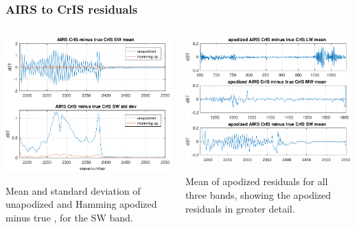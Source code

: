 \documentclass[10pt]{beamer}
\begin{document}
\begin{frame}
\frametitle{AIRS to CrIS residuals}
\begin{columns}[t]
\begin{column}{0.5\textwidth}
  \begin{centering}
  \includegraphics[width=\textwidth]{figures/a2cris_diff_SW.pdf}
  \end{centering}\vspace{3mm}
  Mean and standard deviation of unapodized and Hamming apodized
  {\airs} {\cris} minus true {\cris}, for the {\cris} SW band.

\end{column}
\begin{column}{0.5\textwidth}  
  \begin{centering}
  \includegraphics[width=\textwidth]{figures/a2cris_diff_all.pdf}
  \end{centering}\vspace{5mm}
  Mean of apodized residuals for all three {\cris} bands, showing
  the apodized residuals in greater detail.

\end{column}
\end{columns}
\end{frame}
\end{document}
